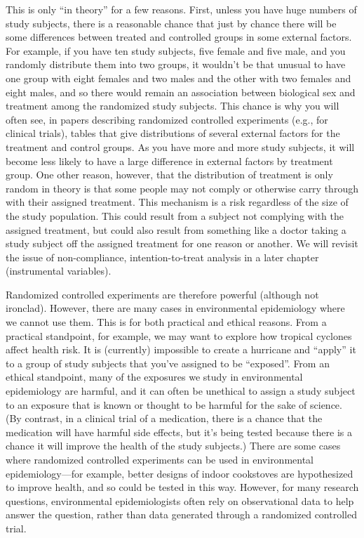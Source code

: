\documentclass[
]{book}
\begin{document}
This is only ``in theory'' for a few reasons. First, unless you have huge numbers of study subjects, there is a reasonable chance that just by chance there will be some differences between treated and controlled groups in some external factors. For example, if you have ten study subjects, five female and five male, and you randomly distribute them into two groups, it wouldn't be that unusual to have one group with eight females and two males and the other with two females and eight males, and so there would remain an association between biological sex and treatment among the randomized study subjects. This chance is why you will often see, in papers describing randomized controlled experiments (e.g., for clinical trials), tables that give distributions of several external factors for the treatment and control groups. As you have more and more study subjects, it will become less likely to have a large difference in external factors by treatment group. One other reason, however, that the distribution of treatment is only random in theory is that some people may not comply or otherwise carry through with their assigned treatment. This mechanism is a risk regardless of the size of the study population. This could result from a subject not complying with the assigned treatment, but could also result from something like a doctor taking a study subject off the assigned treatment for one reason or another. We will revisit the issue of non-compliance, intention-to-treat analysis in a later chapter (instrumental variables).

Randomized controlled experiments are therefore powerful (although not ironclad). However, there are many cases in environmental epidemiology where we cannot use them. This is for both practical and ethical reasons. From a practical standpoint, for example, we may want to explore how tropical cyclones affect health risk. It is (currently) impossible to create a hurricane and ``apply'' it to a group of study subjects that you've assigned to be ``exposed''. From an ethical standpoint, many of the exposures we study in environmental epidemiology are harmful, and it can often be unethical to assign a study subject to an exposure that is known or thought to be harmful for the sake of science. (By contrast, in a clinical trial of a medication, there is a chance that the medication will have harmful side effects, but it's being tested because there is a chance it will improve the health of the study subjects.) There are some cases where randomized controlled experiments can be used in environmental epidemiology---for example, better designs of indoor cookstoves are hypothesized to improve health, and so could be tested in this way. However, for many research questions, environmental epidemiologists often rely on observational data to help answer the question, rather than data generated through a randomized controlled trial.
\end{document}
